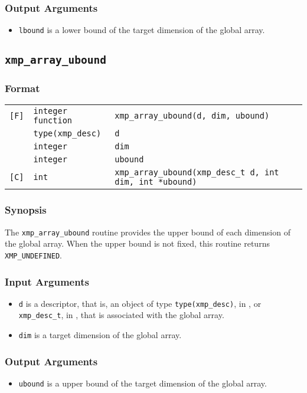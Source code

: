 \subsubsection*{Output Arguments}
\begin{itemize}
 \item {\tt lbound} is a lower bound of the target dimension of the global array.
\end{itemize}


\subsection{\tt xmp\_array\_ubound}

\subsubsection*{Format}

\begin{tabular}{lll}

\verb![F]!& {\tt integer function}& {\tt xmp\_array\_ubound(d, dim, ubound)}\\
          & {\tt type(xmp\_desc)} & {\tt d}\\
          & {\tt integer} & {\tt dim}\\
          & {\tt integer} & {\tt ubound}\\

\verb![C]!&  {\tt int}& {\tt xmp\_array\_ubound(xmp\_desc\_t d, int dim, int *ubound)}\\

\end{tabular}

\subsubsection*{Synopsis}

The {\tt xmp\_array\_ubound} routine provides the upper bound of each dimension of the global array.
  When the upper bound is not fixed, this routine returns {\tt XMP\_UNDEFINED}.

\subsubsection*{Input Arguments}
\begin{itemize}
 \item {\tt d} is a descriptor, that is, an object of type 
       {\tt type(xmp\_desc)}, in {\XMPF}, or {\tt xmp\_desc\_t},
       in {\XMPC}, that is associated with the global array.
 \item {\tt dim} is a target dimension of the global array.
\end{itemize}

\subsubsection*{Output Arguments}
\begin{itemize}
 \item {\tt ubound} is a upper bound of the target dimension of the global array.
\end{itemize}

